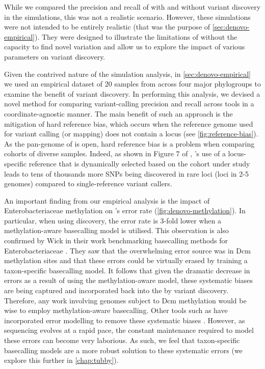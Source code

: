 While we compared the precision and recall of \pandora{} with and without variant discovery in the simulations, this was not a realistic scenario. However, these simulations were not intended to be entirely realistic (that was the purpose of \autoref{sec:denovo-empirical}). They were designed to illustrate the limitations of \pandora{} without the capacity to find novel variation and allow us to explore the impact of various parameters on variant discovery.  

\noindent
Given the contrived nature of the simulation analysis,  in \autoref{sec:denovo-empirical} we used an empirical dataset of 20 \ecoli{} samples from across four major phylogroups to examine the benefit of \denovo{} variant discovery. In performing this analysis, we devised a novel method for comparing variant-calling precision and recall across tools in a coordinate-agnostic manner. The main benefit of such an approach is the mitigation of hard reference bias, which occurs when the reference genome used for variant calling (or mapping) does not contain a locus (see \autoref{fig:reference-bias}). As the pan-genome of \ecoli{} is open, hard reference bias is a problem when comparing cohorts of diverse samples. Indeed, as shown in Figure 7 of \cite{pandora}, \pandora{}'s use of a locus-specific reference that is dynamically selected based on the cohort under study leads to tens of thousands more SNPs being discovered in rare loci (loci in 2-5 genomes) compared to single-reference variant callers.

An important finding from our empirical analysis is the impact of Enterobacteriaceae methylation on \pandora{}'s \ont{} error rate (\autoref{fig:denovo-methylation}). In particular, when using \denovo{} discovery, the \ont{} error rate is 3-fold lower when a methylation-aware basecalling model is utilised. This observation is also confirmed by Wick \etal{} in their work benchmarking \ont{} basecalling methods for Enterobacteriaceae \cite{wick2019}. They saw that the overwhelming error source was in Dcm methylation sites and that these errors could be virtually erased by training a taxon-specific basecalling model. It follows that given the dramatic decrease in \denovo{} errors as a result of using the methylation-aware model, these systematic biases are being captured and incorporated back into the \panrg{} by variant discovery. Therefore, any \ont{} work involving genomes subject to Dcm methylation would be wise to employ methylation-aware basecalling. Other tools such as  have incorporated error modelling to remove these systematic biases \cite{Loman2015}. However, as \ont{} sequencing evolves at a rapid pace, the constant maintenance required to model these errors can become very laborious. As such, we feel that taxon-specific basecalling models are a more robust solution to these systematic errors (we explore this further in \autoref{chap:tubby}).

